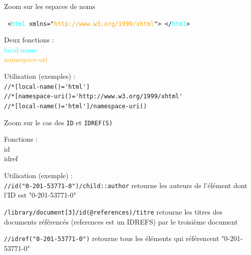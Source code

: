\begin{frame}{Zoom sur les espaces de noms}

\texttt{
<\textcolor{cyan}{html} xmlns="\textcolor{orange}{http://www.w3.org/1999/xhtml}">
</\textcolor{cyan}{html}>
}

\bigskip

Deux fonctions :\\
\textcolor{cyan}{local-name}\\
\textcolor{orange}{namespace-uri}\\

\bigskip

Utilisation (exemples) :\\
\verb?//*[local-name()='html']?\\
\verb?//*[namespace-uri()='http://www.w3.org/1999/xhtml'?\\
\verb?//*[local-name()='html']/namespace-uri()?\\

\end{frame}


\begin{frame}[allowframebreaks]{Zoom sur le cas des \texttt{ID} et \texttt{IDREF(S)}}

Fonctions :\\
id\\
idref\\

\bigskip

Utilisation (exemple) :\\

\verb?//id("0-201-53771-0")/child::author?	retourne les auteurs de l'élément dont l'ID est "0-201-53771-0"\\

\medskip

\verb?/library/document[3]/id(@references)/titre? retourne les titres des documents référencés (references est un IDREFS) par le troisième document\\

\medskip

\verb?//idref("0-201-53771-0")?	retourne tous les éléments qui référencent "0-201-53771-0"

\framebreak


\begin{center}
\end{center}

\framebreak


\begin{center}
\end{center}

\end{frame}

